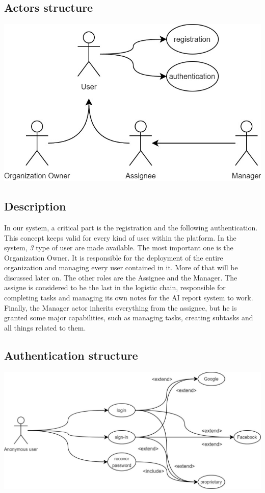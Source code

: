 \documentclass{article}
\begin{document}
\subsection{Actors structure}
\includegraphics[width=\textwidth, height=\textheight, keepaspectratio]{images/UseCaseDiagram/UseCaseUser.jpg}
\subsection*{Description}
In our system, a critical part is the registration and the following authentication. This concept keeps valid for every kind of user within the platform.
In the system, \textit{3} type of user are made available.
The most important one is the Organization Owner. It is responsible for the deployment of the entire organization and managing every user contained in it. More of that will be discussed later on.
The other roles are the Assignee and the Manager. The assigne is considered to be the last in the logistic chain, responsible for completing tasks and managing its own notes for the AI report system to work.
Finally, the Manager actor inherits everything from the assignee, but he is granted some major capabilities, such as managing tasks, creating subtasks and all things related to them.
\subsection{Authentication structure}
\includegraphics[width=\textwidth, keepaspectratio]{images/UseCaseDiagram/UseCaseAuthentication.jpg}
\end{document}
